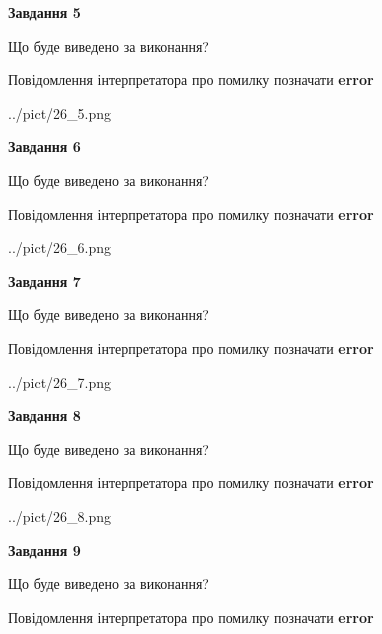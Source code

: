 \documentclass[11pt, ukrainian]{article}
\begin{document}
{\begin {large}
{\begin {center}\textbf{Завдання 5}\end {center}}\par
Що буде виведено за виконання? \par
Повідомлення інтерпретатора про помилку позначати \textbf{error}

\begin{center}
	{../pict/26_5.png}
\end{center}
\newpage

{\begin {center}\textbf{Завдання 6}\end {center}}\par
Що буде виведено за виконання? \par
Повідомлення інтерпретатора про помилку позначати \textbf{error}

\begin{center}
	{../pict/26_6.png}
\end{center}
\newpage

{\begin {center}\textbf{Завдання 7}\end {center}}\par
Що буде виведено за виконання? \par
Повідомлення інтерпретатора про помилку позначати \textbf{error}

\begin{center}
	{../pict/26_7.png}
\end{center}
\newpage

{\begin {center}\textbf{Завдання 8}\end {center}}\par
Що буде виведено за виконання? \par
Повідомлення інтерпретатора про помилку позначати \textbf{error}

\begin{center}
	{../pict/26_8.png}
\end{center}
\newpage

{\begin {center}\textbf{Завдання 9}\end {center}}\par
Що буде виведено за виконання? \par
Повідомлення інтерпретатора про помилку позначати \textbf{error}


\end{large}}
\end{document}
